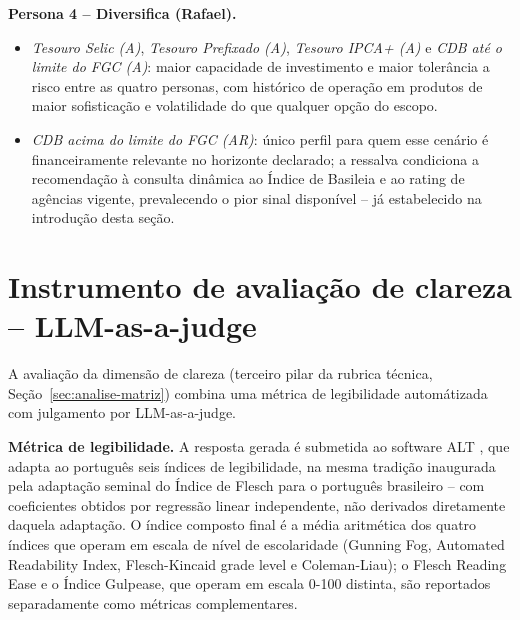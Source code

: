 \textbf{Persona 4 -- Diversifica (Rafael).}
\begin{itemize}
  \item \textit{Tesouro Selic (A)}, \textit{Tesouro Prefixado (A)},
    \textit{Tesouro IPCA+ (A)} e \textit{CDB at\'e o limite do FGC
    (A)}: maior capacidade de investimento e maior toler\^ancia a
    risco entre as quatro personas, com hist\'orico de opera\c{c}\~ao
    em produtos de maior sofistica\c{c}\~ao e volatilidade do que
    qualquer op\c{c}\~ao do escopo.
  \item \textit{CDB acima do limite do FGC (AR)}: \'unico perfil para
    quem esse cen\'ario \'e financeiramente relevante no horizonte
    declarado; a ressalva condiciona a recomenda\c{c}\~ao \`a consulta
    din\^amica ao \'Indice de Basileia e ao rating de ag\^encias
    vigente, prevalecendo o pior sinal dispon\'ivel -- j\'a
    estabelecido na introdu\c{c}\~ao desta se\c{c}\~ao.
\end{itemize}

\section{Instrumento de avalia\c{c}\~ao de clareza -- LLM-as-a-judge}
\label{sec:instrumento-clareza}

A avalia\c{c}\~ao da dimens\~ao de clareza (terceiro pilar da rubrica
t\'ecnica, Se\c{c}\~ao~\ref{sec:analise-matriz}) combina uma m\'etrica
de legibilidade autom\'atizada com julgamento por LLM-as-a-judge.

\textbf{M\'etrica de legibilidade.} A resposta gerada \'e submetida ao
software ALT \autocite{moreno2023alt}, que adapta ao portugu\^es seis
\'indices de legibilidade, na mesma tradi\c{c}\~ao inaugurada pela
adapta\c{c}\~ao seminal do \'Indice de Flesch para o portugu\^es
brasileiro \autocite{martins1996readability} -- com coeficientes
obtidos por regress\~ao linear independente, n\~ao derivados
diretamente daquela adapta\c{c}\~ao. O \'indice composto final \'e a
m\'edia aritm\'etica dos quatro \'indices que operam em escala de
n\'ivel de escolaridade (Gunning Fog, Automated Readability Index,
Flesch-Kincaid grade level e Coleman-Liau); o Flesch Reading Ease e o
\'Indice Gulpease, que operam em escala 0-100 distinta, s\~ao
reportados separadamente como m\'etricas complementares.

